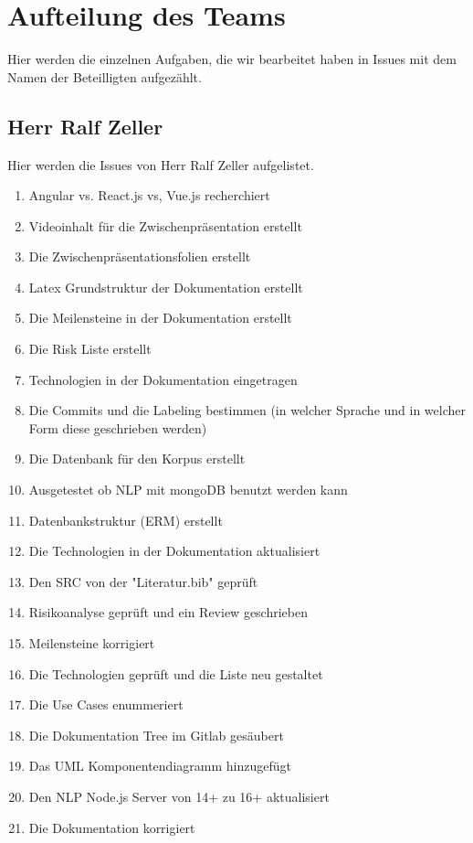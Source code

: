\section{Aufteilung des Teams}
Hier werden die einzelnen Aufgaben, die wir bearbeitet haben in Issues mit dem Namen der Beteilligten aufgezählt.

\subsection{Herr Ralf Zeller}
Hier werden die Issues von Herr Ralf Zeller aufgelistet.
\begin{enumerate}
    \item Angular vs. React.js vs, Vue.js recherchiert
    \item Videoinhalt für die Zwischenpräsentation erstellt
    \item Die Zwischenpräsentationsfolien erstellt
    \item Latex Grundstruktur der Dokumentation erstellt
    \item Die Meilensteine in der Dokumentation erstellt
    \item Die Risk Liste erstellt
    \item Technologien in der Dokumentation eingetragen
    \item Die Commits und die Labeling bestimmen (in welcher Sprache und in welcher Form diese geschrieben werden)
    \item Die Datenbank für den Korpus erstellt
    \item Ausgetestet ob NLP mit mongoDB benutzt werden kann
    \item Datenbankstruktur (ERM) erstellt
    \item Die Technologien in der Dokumentation aktualisiert
    \item Den SRC von der "Literatur.bib" geprüft
    \item Risikoanalyse geprüft und ein Review geschrieben
    \item Meilensteine korrigiert
    \item Die Technologien geprüft und die Liste neu gestaltet
    \item Die Use Cases enummeriert
    \item Die Dokumentation Tree im Gitlab gesäubert
    \item Das UML Komponentendiagramm hinzugefügt
    \item Den NLP Node.js Server von  14+ zu 16+ aktualisiert
    \item Die Dokumentation korrigiert

\end{enumerate}
